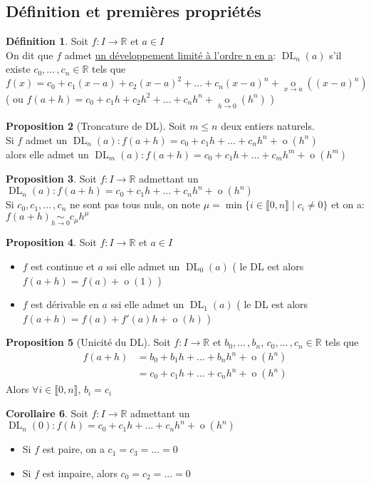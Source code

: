 \documentclass[10pt,a4paper]{article}
\theoremstyle{definition}
\newtheorem{proposition}{Proposition}[section]
\newtheorem{corollaire}[proposition]{Corollaire}
\newtheorem{definition}[proposition]{Définition}
\DeclareMathOperator*{\eqv}{\sim}
\DeclareMathOperator*{\negl}{o}
\DeclareMathOperator{\dl}{DL}
\begin{document}
\subsection{Définition et premières propriétés}
\begin{definition}
Soit $f: I \to \mathbb{R}$ et $a \in I$ \\
On dit que $f$ admet \uline{un développement limité à l'ordre n en a}: $\dl_n(a)$ s'il existe $c_0, ...\,, c_n \in \mathbb{R}$ tels que \\
$f(x) = c_0 + c_1(x - a) + c_2(x - a)^2 + ... + c_n(x - a)^n + \negl\limits_{x \to a}((x - a)^n)$ \\
( ou $f(a + h) = c_0 + c_1 h + c_2 h^2 + ... + c_n h^n + \negl\limits_{h \to 0}(h^n)$ )
\end{definition}
\begin{proposition}[Troncature de DL]
Soit $m \leq n$ deux entiers naturels. \\
Si $f$ admet un $\dl_n(a): f(a + h) = c_0 + c_1 h + ... + c_n h^n +\negl(h^n)$ \\
alors elle admet un $\dl_m(a): f(a + h) = c_0 + c_1 h + ... + c_m h^m + \negl(h^m)$
\end{proposition}
\begin{proposition}
Soit $f: I \to \mathbb{R}$ admettant un $\dl_n(a): f(a + h) = c_0 + c_1 h + ... + c_n h^n + \negl(h^n)$ \\
Si $c_0, c_1, ...\,, c_n$ ne sont pas tous nuls, on note $\mu = \min \{ i \in \llbracket 0, n \rrbracket \mid c_i \neq 0 \}$ et on a: $f(a + h) \eqv\limits_{h \to 0} c_\mu h^\mu$
\end{proposition}
\begin{proposition}
Soit $f: I \to \mathbb{R}$ et $a \in I$
\begin{itemize}
\item $f$ est continue et $a$ ssi elle admet un $\dl_0(a)$ ( le DL est alors $f(a + h) = f(a) + \negl(1)$ )
\item $f$ est dérivable en $a$ ssi elle admet un $\dl_1(a)$ ( le DL est alors $f(a + h) = f(a) + f'(a)h + \negl(h)$ )
\end{itemize}
\end{proposition}
\begin{proposition}[Unicité du DL]
Soit $f: I \to \mathbb{R}$ et $b_0, ...\,, b_n$, $c_0, ...\,, c_n \in \mathbb{R}$ tels que
\begin{align*}
f(a + h) &= b_0 + b_1 h + ... + b_n h^n + \negl(h^n) \\
         &= c_0 + c_1 h + ... + c_n h^n + \negl(h^n)
\end{align*}
Alors $\forall i \in \llbracket 0, n \rrbracket$, $b_i = c_i$
\end{proposition}
\begin{corollaire}
Soit $f: I \to \mathbb{R}$ admettant un $\dl_n(0): f(h) = c_0 + c_1 h + ... + c_n h^n + \negl(h^n)$
\begin{itemize}
\item Si $f$ est paire, on a $c_1 = c_3 = ... = 0$
\item Si $f$ est impaire, alors $c_0 = c_2 = ... = 0$
\end{itemize}
\end{corollaire}
\end{document}
